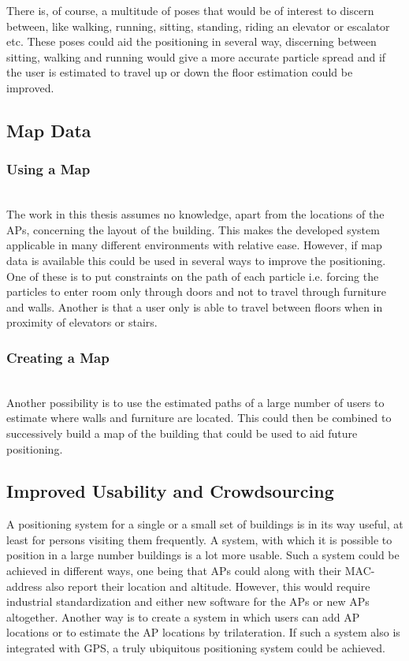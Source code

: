 \documentclass{LTHthesis}
\begin{document}
There is, of course, a multitude of poses that would be of interest to discern between, like walking, running, sitting, standing, riding an elevator or escalator etc. These poses could aid the positioning in several way, discerning between sitting, walking and running would give a more accurate particle spread and if the user is estimated to travel up or down the floor estimation could be improved.
%
\subsection{Map Data}
\subsubsection{Using a Map}~\\
%
The work in this thesis assumes no knowledge, apart from the locations of the APs, concerning the layout of the building. This makes the developed system applicable in many different environments with relative ease. However, if map data is available this could be used in several ways to improve the positioning. One of these is to put constraints on the path of each particle i.e. forcing the particles to enter room only through doors and not to travel through furniture and walls. Another is that a user only is able to travel between floors when in proximity of elevators or stairs. 
%  
\subsubsection{Creating a Map}~\\
%
Another possibility is to use the estimated paths of a large number of users to estimate where walls and furniture are located. This could then be combined to successively build a map of the building that could be used to aid future positioning. 
%
\subsection{Improved Usability and Crowdsourcing}
%
A positioning system for a single or a small set of buildings is in its way useful, at least for persons visiting them frequently. A system, with which it is possible to position in a large number buildings is a lot more usable. Such a system could be achieved in different ways, one being that APs could along with their MAC-address also report their location and altitude. However, this would require industrial standardization and either new software for the APs or new APs altogether. Another way is to create a system in which users can add AP locations or to estimate the AP locations by trilateration. If such a system also is integrated with GPS, a truly ubiquitous positioning system could be achieved.
\end{document}
